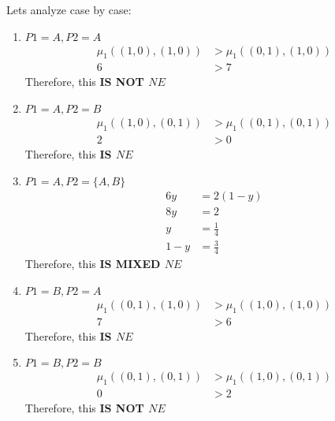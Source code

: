 \documentclass[12pt, a4paper]{article}
\begin{document}
Lets analyze case by case:

\begin{enumerate}
  \item $P1 = A, P2 = A$\\
 \begin{subequations}
  \begin{align}
    \mu_1((1,0),(1,0)) &> \mu_1((0,1),(1,0))\\
    6 &> 7
  \end{align}
\end{subequations}
Therefore, this \textbf{IS NOT $NE$}

 \item $P1 = A, P2 = B$\\
 \begin{subequations}
  \begin{align}
    \mu_1((1,0),(0,1)) &> \mu_1((0,1),(0,1))\\
    2 &> 0
  \end{align}
\end{subequations}
Therefore, this \textbf{IS $NE$}

\item $P1 = A, P2 = \{A,B\}$\\
 \begin{subequations}
  \begin{align}
    6y &= 2(1-y)\\
    8y &= 2\\
     y &= \frac{1}{4}\\
    1-y &= \frac{3}{4}
  \end{align}
\end{subequations}
Therefore, this \textbf{IS MIXED $NE$}


 \item $P1 = B, P2 = A$\\
 \begin{subequations}
  \begin{align}
    \mu_1((0,1),(1,0)) &> \mu_1((1,0),(1,0))\\
    7 &> 6
  \end{align}
\end{subequations}
Therefore, this \textbf{IS $NE$}

 \item $P1 = B, P2 = B$\\
 \begin{subequations}
  \begin{align}
    \mu_1((0,1),(0,1)) &> \mu_1((1,0),(0,1))\\
    0 &> 2
  \end{align}
\end{subequations}
Therefore, this \textbf{IS NOT $NE$}


\end{enumerate}
\end{document}
